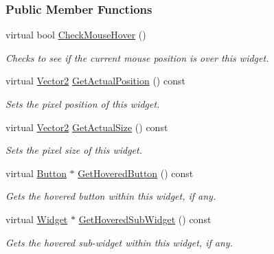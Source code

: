 \subsubsection*{Public Member Functions}
\begin{DoxyCompactItemize}
\item 
virtual bool \hyperlink{classMezzanine_1_1UI_1_1Widget_a66f1b21671530de8f7696185c7080d7b}{CheckMouseHover} ()
\begin{DoxyCompactList}\small\item\em Checks to see if the current mouse position is over this widget. \item\end{DoxyCompactList}\item 
virtual \hyperlink{classMezzanine_1_1Vector2}{Vector2} \hyperlink{classMezzanine_1_1UI_1_1Widget_afa615f27b3b95d4f847f5d779371209a}{GetActualPosition} () const 
\begin{DoxyCompactList}\small\item\em Sets the pixel position of this widget. \item\end{DoxyCompactList}\item 
virtual \hyperlink{classMezzanine_1_1Vector2}{Vector2} \hyperlink{classMezzanine_1_1UI_1_1Widget_acd8f1a20e80c7f4218c38fe961215469}{GetActualSize} () const 
\begin{DoxyCompactList}\small\item\em Sets the pixel size of this widget. \item\end{DoxyCompactList}\item 
virtual \hyperlink{classMezzanine_1_1UI_1_1Button}{Button} $\ast$ \hyperlink{classMezzanine_1_1UI_1_1Widget_ad9ab22e33338ddb8e13bf663de0092f1}{GetHoveredButton} () const 
\begin{DoxyCompactList}\small\item\em Gets the hovered button within this widget, if any. \item\end{DoxyCompactList}\item 
virtual \hyperlink{classMezzanine_1_1UI_1_1Widget}{Widget} $\ast$ \hyperlink{classMezzanine_1_1UI_1_1Widget_a99615938f31dd6b5c6d8fa9d9dc96d3d}{GetHoveredSubWidget} () const 
\begin{DoxyCompactList}\small\item\em Gets the hovered sub-\/widget within this widget, if any. \item\end{DoxyCompactList}\item 

\end{DoxyCompactItemize}
